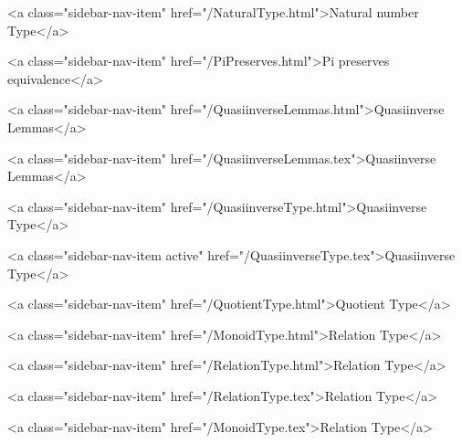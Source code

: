       
    
      
        
          <a class="sidebar-nav-item" href="/NaturalType.html">Natural number Type</a>
        
      
    
      
        
          <a class="sidebar-nav-item" href="/PiPreserves.html">Pi preserves equivalence</a>
        
      
    
      
        
          <a class="sidebar-nav-item" href="/QuasiinverseLemmas.html">Quasiinverse Lemmas</a>
        
      
    
      
        
          <a class="sidebar-nav-item" href="/QuasiinverseLemmas.tex">Quasiinverse Lemmas</a>
        
      
    
      
        
          <a class="sidebar-nav-item" href="/QuasiinverseType.html">Quasiinverse Type</a>
        
      
    
      
        
          <a class="sidebar-nav-item active" href="/QuasiinverseType.tex">Quasiinverse Type</a>
        
      
    
      
        
          <a class="sidebar-nav-item" href="/QuotientType.html">Quotient Type</a>
        
      
    
      
        
          <a class="sidebar-nav-item" href="/MonoidType.html">Relation Type</a>
        
      
    
      
        
          <a class="sidebar-nav-item" href="/RelationType.html">Relation Type</a>
        
      
    
      
        
          <a class="sidebar-nav-item" href="/RelationType.tex">Relation Type</a>
        
      
    
      
        
          <a class="sidebar-nav-item" href="/MonoidType.tex">Relation Type</a>
        
